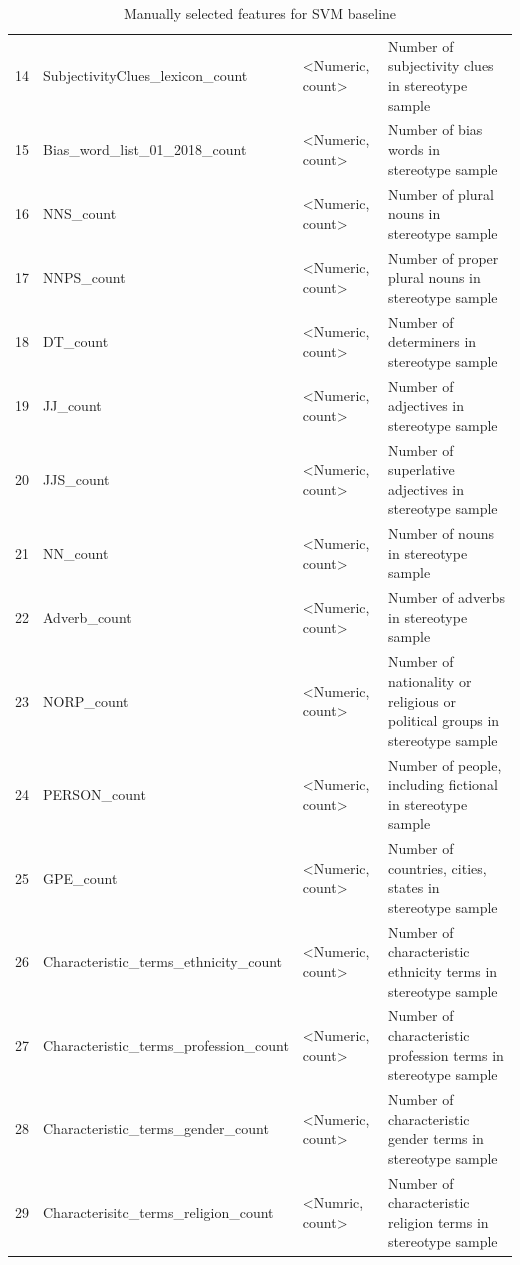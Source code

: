 \begin{table}[]
{\begin{tabular}{@{}llll@{}}
14 & SubjectivityClues\_lexicon\_count        & \textless{}Numeric, count\textgreater{} & Number of subjectivity clues in stereotype sample                           \\
15 & Bias\_word\_list\_01\_2018\_count        & \textless{}Numeric, count\textgreater{} & Number of bias words in stereotype sample                                   \\
16 & NNS\_count               & \textless{}Numeric, count\textgreater{} & Number of plural nouns in stereotype sample                \\
17 & NNPS\_count              & \textless{}Numeric, count\textgreater{} & Number of proper plural nouns in stereotype sample         \\
18 & DT\_count                & \textless{}Numeric, count\textgreater{} & Number of determiners in stereotype sample                 \\
19 & JJ\_count                & \textless{}Numeric, count\textgreater{} & Number of adjectives in stereotype sample                  \\
20 & JJS\_count               & \textless{}Numeric, count\textgreater{} & Number of superlative adjectives in stereotype sample      \\
21 & NN\_count                & \textless{}Numeric, count\textgreater{} & Number of nouns in stereotype sample                       \\
22 & Adverb\_count            & \textless{}Numeric, count\textgreater{} & Number of adverbs in stereotype sample                     \\
23 & NORP\_count                              & \textless{}Numeric, count\textgreater{} & Number of nationality or religious or political groups in stereotype sample \\
24 & PERSON\_count            & \textless{}Numeric, count\textgreater{} & Number of people, including fictional in stereotype sample \\
25 & GPE\_count               & \textless{}Numeric, count\textgreater{} & Number of countries, cities, states in stereotype sample   \\
26 & Characteristic\_terms\_ethnicity\_count  & \textless{}Numeric, count\textgreater{} & Number of characteristic ethnicity terms in stereotype sample               \\
27 & Characteristic\_terms\_profession\_count & \textless{}Numeric, count\textgreater{} & Number of characteristic profession terms in stereotype sample              \\
28 & Characteristic\_terms\_gender\_count     & \textless{}Numeric, count\textgreater{} & Number of characteristic gender terms in stereotype sample                  \\
29 & Characterisitc\_terms\_religion\_count   & \textless{}Numric, count\textgreater{}  & Number of characteristic religion terms in stereotype sample                \\ \bottomrule
\end{tabular}%
}
\caption{Manually selected features for SVM baseline}
\label{tab:features}
\end{table}


